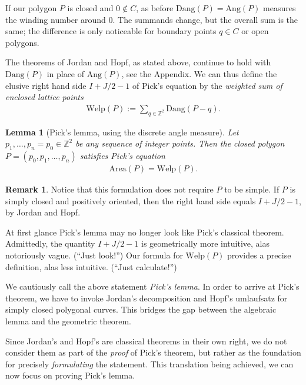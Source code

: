 \documentclass[a4paper]{amsart}
\numberwithin{equation}{section}
\theoremstyle{plain}
\newtheorem{lemma}[theorem]{Lemma}
\theoremstyle{definition}
\newtheorem{remark}[theorem]{Remark}
\newcommand{\Z}{\mathbb{Z}}
\newcommand{\Area}{\mathrm{Area}}
\newcommand{\Ang}{\mathrm{Ang}}
\newcommand{\Dang}{\mathrm{Dang}}
\newcommand{\Welp}{\mathrm{Welp}}
\begin{document}
If our polygon $P$ is closed and $0 \notin C$,
as before $\Dang(P) = \Ang(P)$ measures the winding number around $0$.
The summands change, but the overall sum is the same;
the difference is only noticeable for boundary points $q \in C$ or open polygons.

The theorems of Jordan and Hopf, as stated above, continue
to hold with $\Dang(P)$ in place of $\Ang(P)$, see the Appendix.
We can thus define the elusive right hand side $I + J/2 - 1$ of Pick's equation
by the \emph{weighted sum of enclosed lattice points}
\begin{align}
  \label{eq:Welp}
  \Welp(P) := \sum_{q \in \Z^2} \Dang(P-q) .
\end{align}

\begin{lemma}[Pick's lemma, using the discrete angle measure] \label{lem:PickDiscrete}
  Let $p_1,\ldots,p_n=p_0 \in \Z^2$ be any sequence of integer points.
  Then the closed polygon $P = (p_0,p_1,\ldots,p_n)$ satisfies Pick's equation 
  \begin{align}
    \Area(P) = \Welp(P) .
  \end{align}
\end{lemma}

\begin{remark}
  Notice that this formulation does not require $P$ to be simple.
  If $P$ is simply closed and positively oriented, 
  then the right hand side equals $I + J/2 - 1$,
  by Jordan and Hopf.

  At first glance Pick's lemma may no longer look like Pick's classical theorem.
  Admittedly, the quantity $I + J/2 - 1$ is geometrically more intuitive,
  alas notoriously vague. (``Just look!'') %
  Our formula for $\Welp(P)$ provides a precise definition,
  alas less intuitive. (``Just calculate!'')
  
  We cautiously call the above statement \emph{Pick's lemma}.
  In order to arrive at Pick's theorem,
  we have to invoke Jordan's decomposition and Hopf's umlaufsatz
  for simply closed polygonal curves.
  This bridges the gap between the algebraic lemma
  and the geometric theorem.

  Since Jordan's and Hopf's are classical theorems in their own right,
  we do not consider them as part of the \emph{proof} of Pick's theorem,
  but rather as the foundation for precisely \emph{formulating} the statement.
  This translation being achieved, we can now focus on proving Pick's lemma.
\end{remark}
\end{document}
